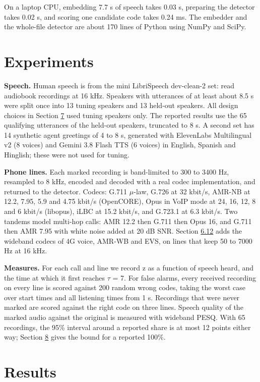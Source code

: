 \documentclass[10pt,a4paper]{article}
\begin{document}
On a laptop CPU, embedding 7.7 s of speech takes 0.03 s, preparing the detector takes 0.02 s, and scoring one candidate code takes 0.24 ms. The embedder and the whole-file detector are about 170 lines of Python using NumPy and SciPy.

\section{Experiments}\label{s-5}

\textbf{Speech.} Human speech is from the mini LibriSpeech dev-clean-2 set: read audiobook recordings at 16 kHz. Speakers with utterances of at least about 8.5 s were split once into 13 tuning speakers and 13 held-out speakers. All design choices in Section \hyperref[s-7]{7} used tuning speakers only. The reported results use the 65 qualifying utterances of the held-out speakers, truncated to 8 s. A second set has 14 synthetic agent greetings of 4 to 8 s, generated with ElevenLabs Multilingual v2 (8 voices) and Gemini 3.8 Flash TTS (6 voices) in English, Spanish and Hinglish; these were not used for tuning.

\textbf{Phone lines.} Each marked recording is band-limited to 300 to 3400 Hz, resampled to 8 kHz, encoded and decoded with a real codec implementation, and returned to the detector. Codecs: G.711 $\mu$-law, G.726 at 32 kbit/s, AMR-NB at 12.2, 7.95, 5.9 and 4.75 kbit/s (OpenCORE), Opus in VoIP mode at 24, 16, 12, 8 and 6 kbit/s (libopus), iLBC at 15.2 kbit/s, and G.723.1 at 6.3 kbit/s. Two tandems model multi-hop calls: AMR 12.2 then G.711 then Opus 16, and G.711 then AMR 7.95 with white noise added at 20 dB SNR. Section \hyperref[s-6-12]{6.12} adds the wideband codecs of 4G voice, AMR-WB and EVS, on lines that keep 50 to 7000 Hz at 16 kHz.

\textbf{Measures.} For each call and line we record z as a function of speech heard, and the time at which it first reaches $\tau$ = 7. For false alarms, every received recording on every line is scored against 200 random wrong codes, taking the worst case over start times and all listening times from 1 s. Recordings that were never marked are scored against the right code on three lines. Speech quality of the marked audio against the original is measured with wideband PESQ. With 65 recordings, the 95\% interval around a reported share is at most 12 points either way; Section \hyperref[s-8]{8} gives the bound for a reported 100\%.

\section{Results}\label{s-6}
\end{document}

